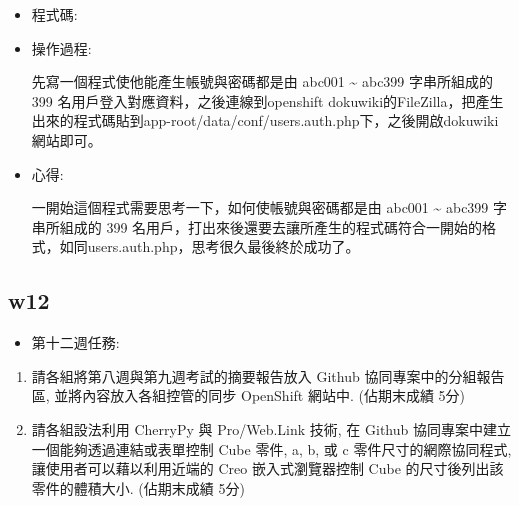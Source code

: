 \documentclass[]{article}
\newenvironment{Shaded}{}{}
\newcommand{\KeywordTok}[1]{\textcolor[rgb]{0.00,0.44,0.13}{\textbf{{#1}}}}
\newcommand{\DataTypeTok}[1]{\textcolor[rgb]{0.56,0.13,0.00}{{#1}}}
\newcommand{\DecValTok}[1]{\textcolor[rgb]{0.25,0.63,0.44}{{#1}}}
\newcommand{\CharTok}[1]{\textcolor[rgb]{0.25,0.44,0.63}{{#1}}}
\newcommand{\StringTok}[1]{\textcolor[rgb]{0.25,0.44,0.63}{{#1}}}
\newcommand{\CommentTok}[1]{\textcolor[rgb]{0.38,0.63,0.69}{\textit{{#1}}}}
\newcommand{\OtherTok}[1]{\textcolor[rgb]{0.00,0.44,0.13}{{#1}}}
\newcommand{\NormalTok}[1]{{#1}}
\begin{document}
\begin{itemize}
\item
  程式碼:

\begin{Shaded}
\end{Shaded}
\item
  操作過程:

  先寫一個程式使他能產生帳號與密碼都是由 abc001 \textasciitilde{} abc399
  字串所組成的 399 名用戶登入對應資料，之後連線到openshift
  dokuwiki的FileZilla，把產生出來的程式碼貼到app-root/data/conf/users.auth.php下，之後開啟dokuwiki網站即可。
\item
  心得:

  一開始這個程式需要思考一下，如何使帳號與密碼都是由 abc001
  \textasciitilde{} abc399 字串所組成的 399
  名用戶，打出來後還要去讓所產生的程式碼符合一開始的格式，如同users.auth.php，思考很久最後終於成功了。
\end{itemize}

\subsection{w12}\label{w12}

\begin{itemize}
\itemsep1pt\parskip0pt
\item
  第十二週任務:
\end{itemize}

\begin{enumerate}
\def\labelenumi{\arabic{enumi}.}
\itemsep1pt\parskip0pt
\item
  請各組將第八週與第九週考試的摘要報告放入 Github
  協同專案中的分組報告區, 並將內容放入各組控管的同步 OpenShift 網站中.
  (佔期末成績 5分)
\item
  請各組設法利用 CherryPy 與 Pro/Web.Link 技術, 在 Github
  協同專案中建立一個能夠透過連結或表單控制 Cube 零件, a, b, 或 c
  零件尺寸的網際協同程式, 讓使用者可以藉以利用近端的 Creo
  嵌入式瀏覽器控制 Cube 的尺寸後列出該零件的體積大小. (佔期末成績 5分)
\end{enumerate}
\end{document}
